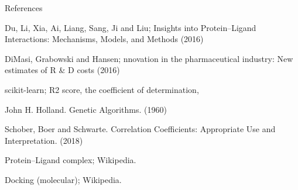 \documentclass{beamer}
\begin{document}
\begin{frame}[t]{References}

\begin{thebibliography}{1}

\alert{Du,  Li,  Xia,  Ai,  Liang,  Sang,  Ji and Liu; Insights into Protein–Ligand Interactions: Mechanisms, Models, and Methods (2016)}

\alert{DiMasi,  Grabowski and Hansen; nnovation in the pharmaceutical industry: New estimates of R \& D costs (2016)}

\alert{scikit-learn; R2 score, the coefficient of determination},

\alert{John H. Holland.  Genetic Algorithms. (1960)}

\alert{Schober, Boer and Schwarte. Correlation Coefficients: Appropriate Use and Interpretation. (2018)}

\alert{Protein–Ligand complex; Wikipedia.}

\alert{Docking (molecular); Wikipedia.}

\end{thebibliography}

\end{frame}
\end{document}
